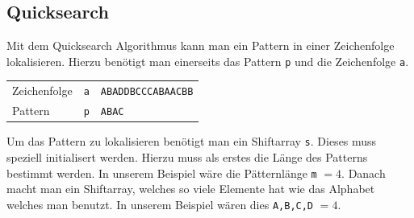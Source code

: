 \newpage
\subsection{Quicksearch}

Mit dem Quicksearch Algorithmus kann man ein Pattern in einer 
Zeichenfolge lokalisieren. Hierzu benötigt man einerseits das
Pattern \verb!p! und die Zeichenfolge \verb!a!.

\begin{table}[h!]
	\centering
	\begin{tabular}{l c l}
		Zeichenfolge
			& \verb!a!
			& \verb!ABADDBCCCABAACBB! \\
		Pattern
			& \verb!p!
			& \verb!ABAC! \\
	\end{tabular}
\end{table}

\noindent
Um das Pattern zu lokalisieren benötigt man ein Shiftarray \verb!s!.
Dieses muss speziell initialisert werden. Hierzu muss als erstes die 
Länge des Patterns bestimmt werden. In unserem Beispiel wäre die
Pätternlänge \verb!m! $=4$. Danach macht man ein Shiftarray, welches
so viele Elemente hat wie das Alphabet welches man benutzt. In unserem
Beispiel wären dies \verb!A,B,C,D! $=4$.

